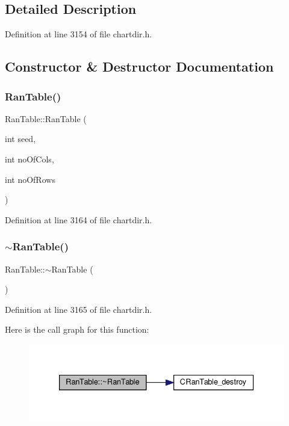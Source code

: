 \subsection{Detailed Description}


Definition at line 3154 of file chartdir.\+h.



\subsection{Constructor \& Destructor Documentation}
\mbox{\label{class_ran_table_aecefc03f8c280f15116227515aaf3d78}} 
\subsubsection{\texorpdfstring{Ran\+Table()}{RanTable()}}
{\footnotesize\ttfamily Ran\+Table\+::\+Ran\+Table (\begin{DoxyParamCaption}\item[{int}]{seed,  }\item[{int}]{no\+Of\+Cols,  }\item[{int}]{no\+Of\+Rows }\end{DoxyParamCaption})\hspace{0.3cm}{\ttfamily [inline]}}



Definition at line 3164 of file chartdir.\+h.

\mbox{\label{class_ran_table_ab3c6f7f8bee3d017cd857cdf731dec24}} 
\subsubsection{\texorpdfstring{$\sim$\+Ran\+Table()}{~RanTable()}}
{\footnotesize\ttfamily Ran\+Table\+::$\sim$\+Ran\+Table (\begin{DoxyParamCaption}{ }\end{DoxyParamCaption})\hspace{0.3cm}{\ttfamily [inline]}}



Definition at line 3165 of file chartdir.\+h.

Here is the call graph for this function\+:
\nopagebreak
\begin{figure}[H]
\begin{center}
\leavevmode
\includegraphics[width=333pt]{class_ran_table_ab3c6f7f8bee3d017cd857cdf731dec24_cgraph}
\end{center}
\end{figure}


